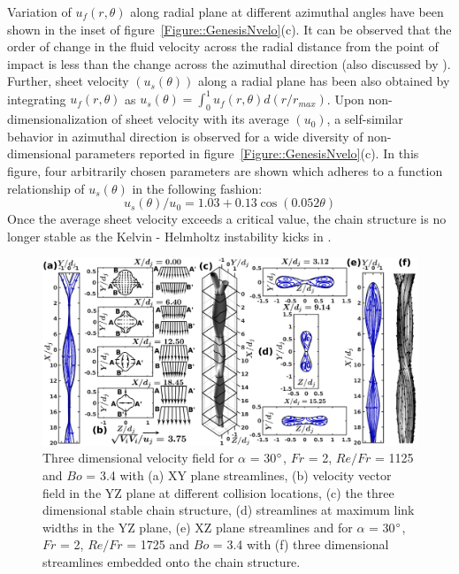 \documentclass{jfm}
\begin{document}
Variation of $u_f(r,\theta)$ along radial plane at different azimuthal angles have been shown in the inset of figure~\ref{Figure::GenesisNvelo}(c). It can be observed that the order of change in the fluid velocity across the radial distance from the point of impact is less than the change across the azimuthal direction (also discussed by \cite{choo2002velocity}). Further, sheet velocity $\left(u_s(\theta)\right)$ along a radial plane has been also obtained by integrating $u_f(r,\theta)$ as $u_s(\theta) = \int_{0}^{1}u_f(r,\theta)d(r/r_{max})$.  %
Upon non-dimensionalization of sheet velocity with its average $\left(u_0\right)$, a self-similar behavior in azimuthal direction is observed for a wide diversity of non-dimensional parameters reported in figure~\ref{Figure::GenesisNvelo}(c). In this figure, four arbitrarily chosen parameters are shown which adheres to a function relationship of $u_s(\theta)$ in the following fashion: 
\begin{equation}\label{Equation::usu0}
u_s(\theta)/u_0 = 1.03 + 0.13\cos(0.052\theta)
\end{equation}
Once the average sheet velocity exceeds a critical value, the chain structure is no longer stable as the  Kelvin - Helmholtz instability kicks in \citep{villermaux2002life}. \\
\begin{figure}
	\centering
	\includegraphics[width=\linewidth]{Figure4}
	\caption{Three dimensional velocity field for $\alpha$ = 30$\degree$, $Fr$ = 2,  $Re/Fr$ = 1125 and $Bo$ = 3.4 with (a) XY plane streamlines, (b) velocity vector field in the YZ plane at different collision locations, (c) the three dimensional stable chain structure, (d) streamlines at maximum link widths in the YZ plane, (e) XZ plane streamlines and for $\alpha$ = 30$\degree$, $Fr$ = 2,  $Re/Fr$ = 1725 and $Bo$ = 3.4 with (f) three dimensional streamlines embedded onto the chain structure.}
	\label{Figure::streamDetails}%
\end{figure}
\end{document}
